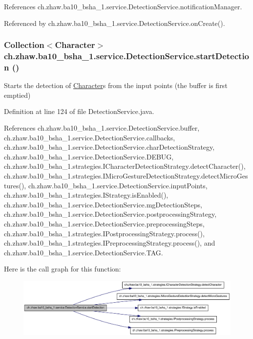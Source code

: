 References ch.zhaw.ba10\_\-bsha\_\-1.service.DetectionService.notificationManager.

Referenced by ch.zhaw.ba10\_\-bsha\_\-1.service.DetectionService.onCreate().\hypertarget{classch_1_1zhaw_1_1ba10__bsha__1_1_1service_1_1DetectionService_a46d2b046ce0e9baa02ee1a064e7bd766}{
\subsubsection[{startDetection}]{\setlength{\rightskip}{0pt plus 5cm}Collection$<${\bf Character}$>$ ch.zhaw.ba10\_\-bsha\_\-1.service.DetectionService.startDetection ()}}
\label{classch_1_1zhaw_1_1ba10__bsha__1_1_1service_1_1DetectionService_a46d2b046ce0e9baa02ee1a064e7bd766}
Starts the detection of \hyperlink{classch_1_1zhaw_1_1ba10__bsha__1_1_1Character}{Character}s from the input points (the buffer is first emptied) 

Definition at line 124 of file DetectionService.java.

References ch.zhaw.ba10\_\-bsha\_\-1.service.DetectionService.buffer, ch.zhaw.ba10\_\-bsha\_\-1.service.DetectionService.callbacks, ch.zhaw.ba10\_\-bsha\_\-1.service.DetectionService.charDetectionStrategy, ch.zhaw.ba10\_\-bsha\_\-1.service.DetectionService.DEBUG, ch.zhaw.ba10\_\-bsha\_\-1.strategies.ICharacterDetectionStrategy.detectCharacter(), ch.zhaw.ba10\_\-bsha\_\-1.strategies.IMicroGestureDetectionStrategy.detectMicroGestures(), ch.zhaw.ba10\_\-bsha\_\-1.service.DetectionService.inputPoints, ch.zhaw.ba10\_\-bsha\_\-1.strategies.IStrategy.isEnabled(), ch.zhaw.ba10\_\-bsha\_\-1.service.DetectionService.mgDetectionSteps, ch.zhaw.ba10\_\-bsha\_\-1.service.DetectionService.postprocessingStrategy, ch.zhaw.ba10\_\-bsha\_\-1.service.DetectionService.preprocessingSteps, ch.zhaw.ba10\_\-bsha\_\-1.strategies.IPostprocessingStrategy.process(), ch.zhaw.ba10\_\-bsha\_\-1.strategies.IPreprocessingStrategy.process(), and ch.zhaw.ba10\_\-bsha\_\-1.service.DetectionService.TAG.

Here is the call graph for this function:\nopagebreak
\begin{figure}[H]
\begin{center}
\leavevmode
\includegraphics[width=382pt]{classch_1_1zhaw_1_1ba10__bsha__1_1_1service_1_1DetectionService_a46d2b046ce0e9baa02ee1a064e7bd766_cgraph}
\end{center}
\end{figure}


